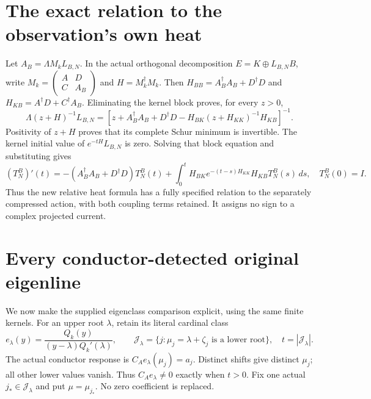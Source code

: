 \documentclass[11pt]{article}
\begin{document}
\section{The exact relation to the observation's own heat}
Let $A_B=\Lambda M_kL_{B,N}$. In the actual orthogonal decomposition
$E=K\oplus L_{B,N}B$, write
$M_k=\left(\begin{smallmatrix}A&D\\C&A_B\end{smallmatrix}\right)$
and $H=M_k^\dagger M_k$.
Then $H_{BB}=A_B^\dagger A_B+D^\dagger D$ and
$H_{KB}=A^\dagger D+C^\dagger A_B$.
Eliminating the kernel block proves, for every $z>0$,
\[
\Lambda(z+H)^{-1}L_{B,N}
=\left[z+A_B^\dagger A_B+D^\dagger D
-H_{BK}(z+H_{KK})^{-1}H_{KB}\right]^{-1}.
\tag{IFH16}
\]
Positivity of $z+H$ proves that its complete Schur minimum is invertible.
The kernel initial value of $e^{-tH}L_{B,N}$ is zero. Solving that
block equation and substituting gives
\[
(T_N^B)'(t)=-(A_B^\dagger A_B+D^\dagger D)T_N^B(t)
+\int_0^tH_{BK}e^{-(t-s)H_{KK}}H_{KB}T_N^B(s)\,ds,\quad
T_N^B(0)=I .
\tag{IFH17}
\]
Thus the new relative heat formula has a fully specified relation to
the separately compressed action, with both coupling terms retained.
It assigns no sign to a complex projected current.

\section{Every conductor-detected original eigenline}
We now make the supplied eigenclass comparison explicit, using the
same finite kernels. For an upper root $\lambda$, retain its literal
cardinal class
\[
e_\lambda(y)=\frac{Q_k(y)}{(y-\lambda)Q_k'(\lambda)},\qquad
\mathcal J_\lambda=\{j:\mu_j=\lambda+\zeta_j
                       \text{ is a lower root}\},\quad t=|\mathcal J_\lambda|.
\]
The actual conductor response is $C_Ae_\lambda(\mu_j)=a_j$.
Distinct shifts give distinct $\mu_j$; all other lower values vanish.
Thus $C_Ae_\lambda\ne0$ exactly when $t>0$.
Fix one actual $j_*\in\mathcal J_\lambda$ and put $\mu=\mu_{j_*}$.
No zero coefficient is replaced.
\end{document}
